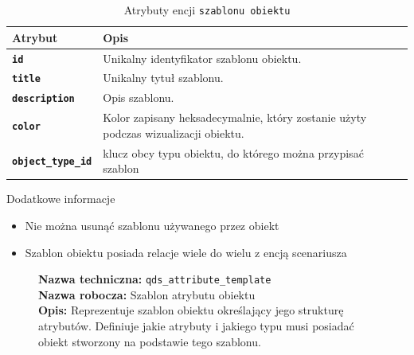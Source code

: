 \begin{table}[H]
    \centering
    \renewcommand{\arraystretch}{1.6}
    \begin{tabular}{|>{\bfseries}l|p{}|}
        \hline
        \rowcolor[HTML]{EFEFEF} \textbf{Atrybut} & \textbf{Opis} \\
        \hline
        \texttt{id} & Unikalny identyfikator szablonu obiektu. \\
        \hline
        \texttt{title} & Unikalny tytuł szablonu. \\
        \hline
        \texttt{description} & Opis szablonu. \\
        \hline
        \texttt{color} & Kolor zapisany heksadecymalnie, który zostanie użyty podczas wizualizacji obiektu. \\
        \hline
        \texttt{object\_type\_id} & klucz obcy typu obiektu, do którego można przypisać szablon \\
        \hline
    \end{tabular}
    \caption{Atrybuty encji \texttt{szablonu obiektu}}
\end{table}

Dodatkowe informacje
\begin{itemize}
    \item Nie można usunąć szablonu używanego przez obiekt
    \item Szablon obiektu posiada relacje wiele do wielu z encją scenariusza 
\end{itemize}

\begin{figure}[H]
    \centering
    \begin{minipage}{0.8\textwidth} 
        \begin{framed}
            \noindent\textbf{\large Nazwa techniczna:} \texttt{qds\_attribute\_template} \\
            \textbf{\large Nazwa robocza:} Szablon atrybutu obiektu \\
            \textbf{\large Opis:} Reprezentuje szablon obiektu określający jego strukturę atrybutów.
            Definiuje jakie atrybuty i jakiego typu musi posiadać obiekt stworzony na podstawie tego szablonu.
        \end{framed}
    \end{minipage}
\end{figure}

